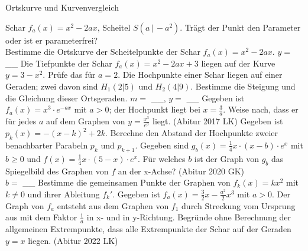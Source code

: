 \setcounter{aufgabe}{17}

\begin{aufgabe}{Ortskurve und Kurvenvergleich}
\begin{teile}
\teil Schar $f_a(x) = x^2 - 2a x$, Scheitel $S(a \,|\, -a^2)$. Trägt der Punkt den Parameter oder ist er parameterfrei? \\  
\teil Bestimme die Ortskurve der Scheitelpunkte der Schar $f_a(x) = x^2 - 2a x$. $y =$ \_\_
\teil Die Tiefpunkte der Schar $f_a(x) = x^2 - 2a x + 3$ liegen auf der Kurve $y = 3 - x^2$. Prüfe das für $a = 2$.
\teil Die Hochpunkte einer Schar liegen auf einer Geraden; zwei davon sind $H_1(2 | 5)$ und $H_2(4 | 9)$. Bestimme die Steigung und die Gleichung dieser Ortsgeraden. $m =$ \_\_, $y =$ \_\_
\teil Gegeben ist $f_a(x) = x^3 \cdot e^{-a x}$ mit $a > 0$; der Hochpunkt liegt bei $x = \frac{3}{a}$. Weise nach, dass er für jedes $a$ auf dem Graphen von $y = \frac{x^3}{e^3}$ liegt. \hfill (Abitur 2017 LK)
\teil Gegeben ist $p_k(x) = -(x - k)^2 + 2k$. Berechne den Abstand der Hochpunkte zweier benachbarter Parabeln $p_k$ und $p_{k+1}$. \leerfeld
\teil Gegeben sind $g_b(x) = \frac{1}{4}x \cdot (x - b) \cdot e^{x}$ mit $b \ge 0$ und $f(x) = \frac{1}{4}x \cdot (5 - x) \cdot e^{x}$. Für welches $b$ ist der Graph von $g_b$ das Spiegelbild des Graphen von $f$ an der x-Achse? \hfill (Abitur 2020 GK) \\ $b =$ \_\_
\teil Bestimme die gemeinsamen Punkte der Graphen von $f_k(x) = k x^2$ mit $k \neq 0$ und ihrer Ableitung $f_k'$.
\teil Gegeben ist $f_a(x) = \frac{3}{2}x - \frac{a^2}{2}x^3$ mit $a > 0$. Der Graph von $f_a$ entsteht aus dem Graphen von $f_1$ durch Streckung vom Ursprung aus mit dem Faktor $\frac{1}{a}$ in x- und in y-Richtung. Begründe ohne Berechnung der allgemeinen Extrempunkte, dass alle Extrempunkte der Schar auf der Geraden $y = x$ liegen. \hfill (Abitur 2022 LK)
\end{teile}
\end{aufgabe}

